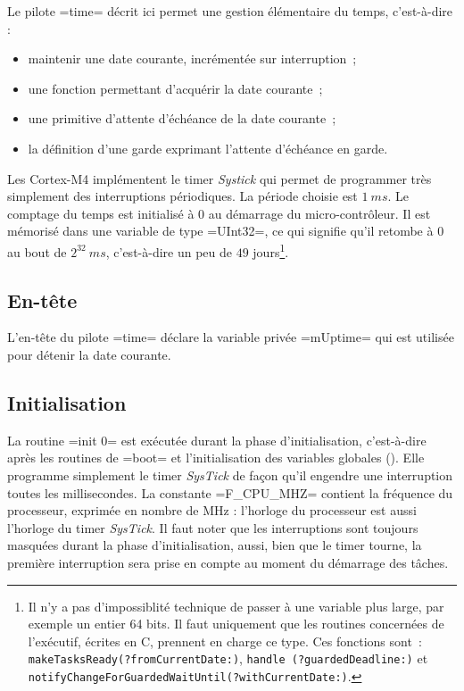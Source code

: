 
Le pilote \plm=time= décrit ici permet une gestion élémentaire du temps, c'est-à-dire :
\begin{itemize}
  \item maintenir une date courante, incrémentée sur interruption~;
  \item une fonction permettant d'acquérir la date courante~;
  \item une primitive d'attente d'échéance de la date courante~;
  \item la définition d'une garde exprimant l'attente d'échéance en garde.
\end{itemize}

Les Cortex-M4 implémentent le timer \emph{Systick} qui permet de programmer très simplement des interruptions périodiques. La période choisie est $1~ms$. Le comptage du temps est initialisé à $0$ au démarrage du micro-contrôleur. Il est mémorisé dans une variable de type \plm=UInt32=, ce qui signifie qu'il retombe à $0$ au bout de $2^{32}~ms$, c'est-à-dire un peu de $49$ jours\footnote{Il n'y a pas d'impossiblité technique de passer à une variable plus large, par exemple un entier 64 bits. Il faut uniquement que les routines concernées de l'exécutif, écrites en C, prennent en charge ce type. Ces fonctions sont~: \texttt{makeTasksReady(?fromCurrentDate{}:)}, \texttt{handle (?guardedDeadline{}:)} et \texttt{notifyChangeForGuardedWaitUntil(?withCurrentDate{}:)}.}.



\subsection{En-tête}

L'en-tête du pilote \plm=time= déclare la variable privée \plm=mUptime= qui est utilisée pour détenir la date courante.

\begin{PLM}
driver time {
  var mUptime UInt32 = 0
\end{PLM}



\subsection{Initialisation}

La routine \plm=init 0= est exécutée durant la phase d'initialisation, c'est-à-dire après les routines de \plm=boot= et l'initialisation des variables globales (). Elle programme simplement le timer \emph{SysTick} de façon qu'il engendre une interruption toutes les millisecondes. La constante \plm=F_CPU_MHZ= contient la fréquence du processeur, exprimée en nombre de MHz : l'horloge du processeur est aussi l'horloge du timer \emph{SysTick}. Il faut noter que les interruptions sont toujours masquées durant la phase d'initialisation, aussi, bien que le timer tourne, la première interruption sera prise en compte au moment du démarrage des tâches.


